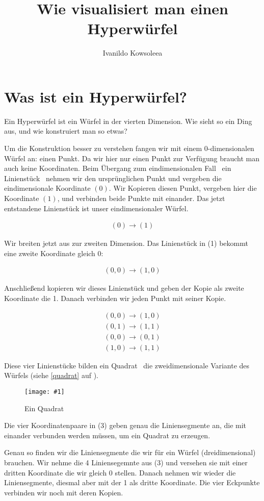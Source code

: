 \documentclass[10pt,a4paper,twoside,titlepage]{article}
\author{Ivanildo Kowsoleea}
\title{Wie visualisiert man einen Hyperwürfel}
\newcommand{\myeq}[2]{
	\begin{equation}
		\begin{split}
			#1
		\end{split}
		\label{#2}
	\end{equation}
}
\newcommand{\image}[4]{
	\begin{figure}[!ht]
		\centering
		\texttt{[image: \#1]}
		\caption{#2}
		\label{#3}
	\end{figure}
}
\begin{document}
\maketitle
\leading{13pt}

\section{Was ist ein Hyperwürfel?}
Ein Hyperwürfel ist ein Würfel in der vierten Dimension. Wie sieht so
ein Ding aus, und wie konstruiert man so etwas?

Um die Konstruktion besser zu verstehen fangen wir mit einem 0-dimen\-siona\-len
Würfel an: einen Punkt. Da wir hier nur einen Punkt zur Verfügung 
braucht man auch keine Koordinaten. Beim Übergang zum eindimensionalen Fall 
\textemdash\ ein Linienstück \textemdash\ nehmen wir den ursprünglichen Punkt
und vergeben die eindimensionale Koordinate $(0)$. Wir Kopieren diesen Punkt,
vergeben hier die Koordinate $(1)$, und verbinden beide Punkte mit einander.
Das jetzt entstandene Linienstück ist unser eindimensionaler Würfel.

\myeq{(0)\rightarrow (1)}{dim1}

Wir breiten jetzt aus zur zweiten Dimension. Das Linienstück in (1)
bekommt eine zweite Koordinate gleich 0:
\myeq{(0,0)\rightarrow (1,0)}{dim1in2}
Anschließend kopieren wir dieses Linienstück und geben der Kopie als zweite
Koordinate die 1. Danach verbinden wir jeden Punkt mit seiner Kopie.

\myeq{(0,0)\rightarrow (1,0)\\
	(0,1)\rightarrow(1,1)\\
	(0,0)\rightarrow(0,1)\\
	(1,0)\rightarrow(1,1)}{dim2}
	
Diese vier Linienstücke bilden ein Quadrat \textemdash\ die zweidimensionale
Variante des Würfels (siehe \autoref{quadrat} auf ).

\image{img/quadrat.eps}{Ein Quadrat}{quadrat}{5}

Die vier Koordinatenpaare in (3) geben genau die Liniensegmente an, die
mit einander verbunden werden müssen, um ein Quadrat zu erzeugen.

Genau so finden wir die Liniensegmente die wir für ein Würfel (dreidimensional)
brauchen. Wir nehme die 4 Liniensegemnte aus (3) und versehen sie mit einer
dritten Koordinate die wir gleich 0 stellen. Danach nehmen wir wieder die 
Liniensegmente, diesmal aber mit der 1 als dritte Koordinate. Die 
vier Eckpunkte verbinden wir noch mit deren Kopien.
\end{document}
